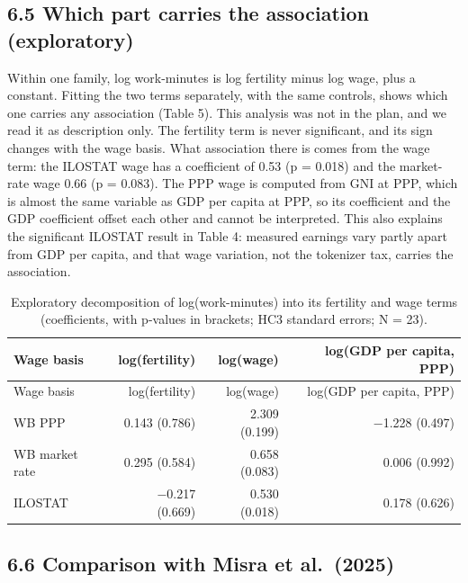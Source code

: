 \documentclass[11pt]{article}
\begin{document}
\subsection{6.5 Which part carries the association (exploratory)}

Within one family, log work-minutes is log fertility minus log wage, plus a constant. Fitting the two terms separately, with the same controls, shows which one carries any association (Table 5). This analysis was not in the plan, and we read it as description only. The fertility term is never significant, and its sign changes with the wage basis. What association there is comes from the wage term: the ILOSTAT wage has a coefficient of 0.53 (p = 0.018) and the market-rate wage 0.66 (p = 0.083). The PPP wage is computed from GNI at PPP, which is almost the same variable as GDP per capita at PPP, so its coefficient and the GDP coefficient offset each other and cannot be interpreted. This also explains the significant ILOSTAT result in Table 4: measured earnings vary partly apart from GDP per capita, and that wage variation, not the tokenizer tax, carries the association.

\begin{longtable}[]{@{}lrrr@{}}
\caption{Exploratory decomposition of log(work-minutes) into its fertility and wage terms (coefficients, with p-values in brackets; HC3 standard errors; N = 23).}\tabularnewline
\toprule\noalign{}
Wage basis & log(fertility) & log(wage) & log(GDP per capita, PPP) \\
\midrule\noalign{}
\endfirsthead
\toprule\noalign{}
Wage basis & log(fertility) & log(wage) & log(GDP per capita, PPP) \\
\midrule\noalign{}
\endhead
\bottomrule\noalign{}
\endlastfoot
WB PPP & 0.143 (0.786) & 2.309 (0.199) & −1.228 (0.497) \\
WB market rate & 0.295 (0.584) & 0.658 (0.083) & 0.006 (0.992) \\
ILOSTAT & −0.217 (0.669) & 0.530 (0.018) & 0.178 (0.626) \\
\end{longtable}

\subsection{6.6 Comparison with Misra et al.~(2025)}
\end{document}
